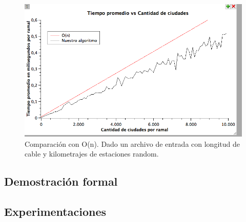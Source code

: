 \begin{figure}[H]
\begin{center}

  \includegraphics[width=\linewidth]{../graficos/ej1/1erEjTiempoPromedioVsO(n).png}
  \caption{{\small Comparación con O(n). Dado un archivo de entrada con longitud de cable y kilometrajes de estaciones random.}} \label{ej1-tiempo-vs-cant-ciudades-random}
\endminipage

\end{center}
\end{figure}
\subsection{Demostración formal}
\subsection{Experimentaciones}